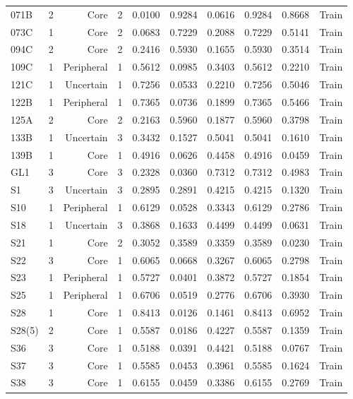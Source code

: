 {\begin{longtable}{lrrrrrrrrr}
  071B & 2 & Core & 2 & 0.0100 & 0.9284 & 0.0616 & 0.9284 & 0.8668 & Train \\
  073C & 1 & Core & 2 & 0.0683 & 0.7229 & 0.2088 & 0.7229 & 0.5141 & Train \\
  094C & 2 & Core & 2 & 0.2416 & 0.5930 & 0.1655 & 0.5930 & 0.3514 & Train \\
  109C & 1 & Peripheral & 1 & 0.5612 & 0.0985 & 0.3403 & 0.5612 & 0.2210 & Train \\
  121C & 1 & Uncertain & 1 & 0.7256 & 0.0533 & 0.2210 & 0.7256 & 0.5046 & Train \\
  122B & 1 & Peripheral & 1 & 0.7365 & 0.0736 & 0.1899 & 0.7365 & 0.5466 & Train \\
  125A & 2 & Core & 2 & 0.2163 & 0.5960 & 0.1877 & 0.5960 & 0.3798 & Train \\
  133B & 1 & Uncertain & 3 & 0.3432 & 0.1527 & 0.5041 & 0.5041 & 0.1610 & Train \\
  139B & 1 & Core & 1 & 0.4916 & 0.0626 & 0.4458 & 0.4916 & 0.0459 & Train \\
  GL1 & 3 & Core & 3 & 0.2328 & 0.0360 & 0.7312 & 0.7312 & 0.4983 & Train \\
  S1 & 3 & Uncertain & 3 & 0.2895 & 0.2891 & 0.4215 & 0.4215 & 0.1320 & Train \\
  S10 & 1 & Peripheral & 1 & 0.6129 & 0.0528 & 0.3343 & 0.6129 & 0.2786 & Train \\
  S18 & 1 & Uncertain & 3 & 0.3868 & 0.1633 & 0.4499 & 0.4499 & 0.0631 & Train \\
  S21 & 1 & Core & 2 & 0.3052 & 0.3589 & 0.3359 & 0.3589 & 0.0230 & Train \\
  S22 & 3 & Core & 1 & 0.6065 & 0.0668 & 0.3267 & 0.6065 & 0.2798 & Train \\
  S23 & 1 & Peripheral & 1 & 0.5727 & 0.0401 & 0.3872 & 0.5727 & 0.1854 & Train \\
  S25 & 1 & Peripheral & 1 & 0.6706 & 0.0519 & 0.2776 & 0.6706 & 0.3930 & Train \\
  S28 & 1 & Core & 1 & 0.8413 & 0.0126 & 0.1461 & 0.8413 & 0.6952 & Train \\
  S28(5) & 2 & Core & 1 & 0.5587 & 0.0186 & 0.4227 & 0.5587 & 0.1359 & Train \\
  S36 & 3 & Core & 1 & 0.5188 & 0.0391 & 0.4421 & 0.5188 & 0.0767 & Train \\
  S37 & 3 & Core & 1 & 0.5585 & 0.0453 & 0.3961 & 0.5585 & 0.1624 & Train \\
  S38 & 3 & Core & 1 & 0.6155 & 0.0459 & 0.3386 & 0.6155 & 0.2769 & Train \\

\end{longtable}}
